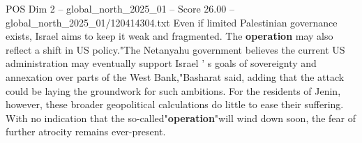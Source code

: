\begin{textsample}{POS Dim 2 – global\_north\_2025\_01 – Score 26.00 – global\_north\_2025\_01/120414304.txt}
Even if limited Palestinian governance exists, Israel aims to keep it weak and fragmented.
The \textbf{operation} may also reflect a shift in US policy."The Netanyahu government believes the current US administration may eventually support Israel ' s goals of sovereignty and annexation over parts of the West Bank,"Basharat said, adding that the attack could be laying the groundwork for such ambitions.
For the residents of Jenin, however, these broader geopolitical calculations do little to ease their suffering.
With no indication that the so-called"\textbf{operation}"will wind down soon, the fear of further atrocity remains ever-present.

\end{textsample}
